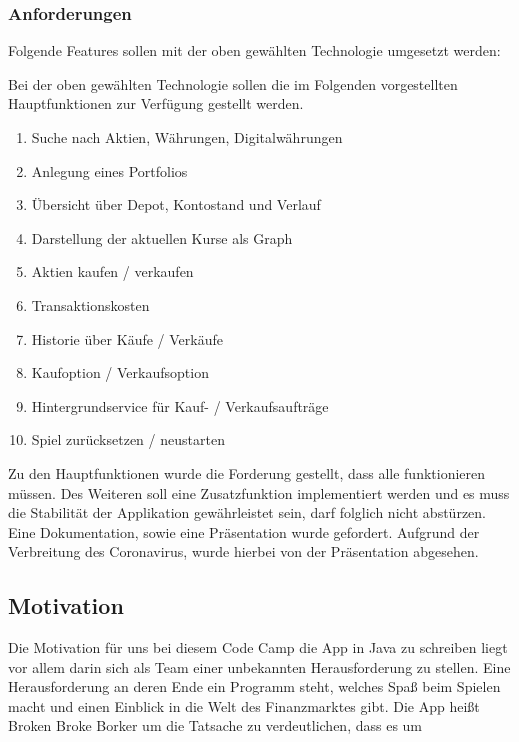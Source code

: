 \documentclass[10pt]{scrartcl}
\begin{document}
\subsubsection{Anforderungen}
Folgende Features sollen mit der oben gewählten Technologie umgesetzt werden:

Bei der oben gewählten Technologie sollen die im Folgenden vorgestellten Hauptfunktionen zur Verfügung gestellt werden.

\begin{enumerate}
	\item 
	Suche nach Aktien, Währungen, Digitalwährungen
	\item
	Anlegung eines Portfolios
	\item
	Übersicht über Depot, Kontostand und Verlauf
	\item
	Darstellung der aktuellen Kurse als Graph
	\item
	Aktien kaufen / verkaufen
	\item
	Transaktionskosten
	\item
	Historie über Käufe / Verkäufe
	\item
	Kaufoption / Verkaufsoption
	\item
	Hintergrundservice für Kauf- / Verkaufsaufträge
	\item
	Spiel zurücksetzen / neustarten
\end{enumerate}


Zu den Hauptfunktionen wurde die Forderung gestellt, dass alle funktionieren müssen. Des Weiteren soll eine Zusatzfunktion implementiert werden und es muss die Stabilität der Applikation gewährleistet sein, darf folglich nicht abstürzen. Eine Dokumentation, sowie eine Präsentation wurde gefordert. Aufgrund der Verbreitung des Coronavirus, wurde hierbei von der Präsentation abgesehen.



\subsection{Motivation}
Die Motivation für uns bei diesem Code Camp die App in Java zu schreiben liegt vor allem darin sich als Team einer unbekannten Herausforderung zu stellen. Eine Herausforderung an deren Ende ein Programm steht, welches Spaß beim Spielen macht und einen Einblick in die Welt des Finanzmarktes gibt. Die App heißt Broken Broke Borker um die Tatsache zu verdeutlichen, dass es um 
\end{document}
